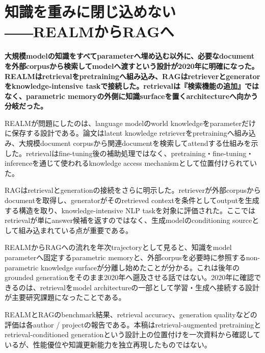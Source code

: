 \section{知識を重みに閉じ込めない――REALMからRAGへ}
\noindent\textbf{大規模modelの知識をすべてparameterへ埋め込む以外に、必要なdocumentを外部corpusから検索してmodelへ渡すという設計が2020年に明確になった。REALMはretrievalをpretrainingへ組み込み、RAGはretrieverとgeneratorをknowledge-intensive taskで接続した。retrievalは『検索機能の追加』ではなく、parametric memoryの外側に知識surfaceを置くarchitectureへ向かう分岐だった。}\autocite{src-38c08ba169f1,src-4bf65d8fc7dc,src-c441b6f2b8f4}

REALMが問題にしたのは、language modelのworld knowledgeをparameterだけに保存する設計である。論文はlatent knowledge retrieverをpretrainingへ組み込み、大規模document corpusから関連documentを検索してattendする仕組みを示した。retrievalはfine-tuning後の補助処理ではなく、pretraining・fine-tuning・inferenceを通じて使われるknowledge access mechanismとして位置付けられていた。\autocite{src-4bf65d8fc7dc}


RAGはretrievalとgenerationの接続をさらに明示した。retrieverが外部corpusからdocumentを取得し、generatorがそのretrieved contextを条件としてoutputを生成する構造を取り、knowledge-intensive NLP taskを対象に評価された。ここではretrievalが単にanswer候補を返すのではなく、生成modelのconditioning sourceとして組み込まれている点が重要である。\autocite{src-38c08ba169f1,src-c441b6f2b8f4}


REALMからRAGへの流れを年次trajectoryとして見ると、知識をmodel parameterへ固定するparametric memoryと、外部corpusを必要時に参照するnon-parametric knowledge surfaceが分離し始めたことが分かる。これは後年のgrounded generationをそのまま2020年へ遡及させる話ではない。2020年に確認できるのは、retrievalをmodel architectureの一部として学習・生成へ接続する設計が主要研究課題になったことである。\autocite{src-38c08ba169f1,src-4bf65d8fc7dc,src-c441b6f2b8f4}


\begin{claimboundary}
REALMとRAGのbenchmark結果、retrieval accuracy、generation qualityなどの評価は各author / projectの報告である。本稿はretrieval-augmented pretrainingとretrieval-conditioned generationという設計上の位置付けを一次資料から確認しているが、性能優位や知識更新能力を独立再現したものではない。\autocite{src-38c08ba169f1,src-4bf65d8fc7dc,src-c441b6f2b8f4}
\end{claimboundary}
